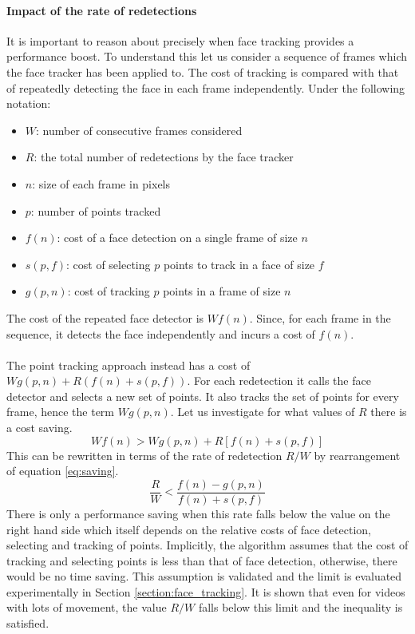 \paragraph{Impact of the rate of redetections}
It is important to reason about precisely when face tracking provides a performance boost. To understand this let us consider a sequence of frames which the face tracker has been applied to. The cost of tracking is compared with that of repeatedly detecting the face in each frame independently. Under the following notation:
\begin{itemize}
   \item $W$: number of consecutive frames considered 
   \item $R$: the total number of redetections by the face tracker
   \item $n$: size of each frame in pixels
   \item $p$: number of points tracked
   \item $f(n)$: cost of a face detection on a single frame of size $n$
   \item $s(p,f)$: cost of selecting $p$ points to track in a face of size $f$
   \item $g(p,n)$: cost of tracking $p$ points in a frame of size $n$
\end{itemize}
The cost of the repeated face detector is $Wf(n)$. Since, for each frame in the sequence, it detects the face independently and incurs a cost of $f(n)$.  
\\ \\
The point tracking approach instead has a cost of $Wg(p,n) + R(f(n) + s(p,f))$. For each redetection it calls the face detector and selects a new set of points. It also tracks the set of points for every frame, hence the term $Wg(p,n)$. Let us investigate for what values of $R$ there is a cost saving.
\begin{equation}
    Wf(n) > Wg(p,n) + R[f(n) + s(p,f)] 
    \label{eq:saving}
\end{equation}
This can be rewritten in terms of the rate of redetection $R/W$ by rearrangement of equation \ref{eq:saving}.
\begin{equation}
    \frac{R}{W} < \frac{f(n) - g(p,n)}{f(n) + s(p,f)}
\end{equation}
 There is only a performance saving when this rate falls below the value on the right hand side which itself depends on the relative costs of face detection, selecting and tracking of points. Implicitly, the algorithm assumes that the cost of tracking and selecting points is less than that of face detection, otherwise, there would be no time saving. This assumption is validated and the limit is evaluated experimentally in Section \ref{section:face_tracking}. It is shown that even for videos with lots of movement, the value $R/W$ falls below this limit and the inequality is satisfied. 
